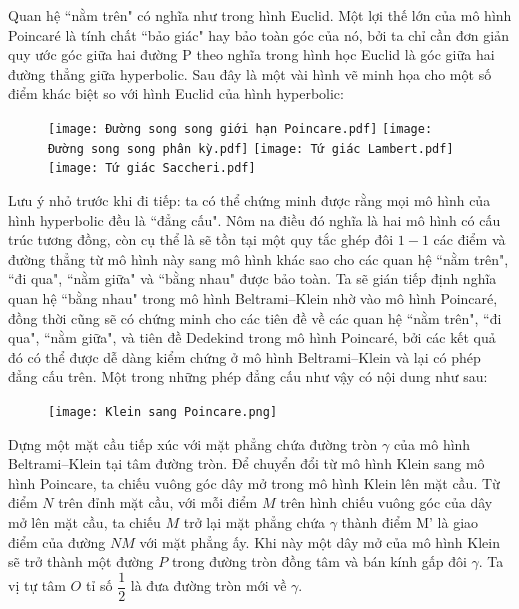 \begin{multicols}{2}
	Quan hệ ``nằm trên" có nghĩa như trong hình Euclid. Một lợi thế lớn của mô hình Poincaré là tính chất ``bảo giác" hay bảo toàn góc của nó, bởi ta chỉ cần đơn giản quy ước góc giữa hai đường P theo nghĩa trong hình học Euclid là góc giữa hai đường thẳng giữa hyperbolic.
	Sau đây là một vài hình vẽ minh họa cho một số điểm khác biệt so với hình Euclid của hình hyperbolic:
	\begin{figure}[H]
		\vspace*{-5pt}
		\centering
		\captionsetup{labelformat= empty, justification=centering}
		\texttt{[image: Đường song song giới hạn Poincare.pdf]}
		\texttt{[image: Đường song song phân kỳ.pdf]}
		\texttt{[image: Tứ giác Lambert.pdf]}
		\texttt{[image: Tứ giác Saccheri.pdf]}
		\vspace*{-10pt}
	\end{figure}	
	Lưu ý nhỏ trước khi đi tiếp: ta có thể chứng minh được rằng mọi mô hình của hình hyperbolic đều là ``đẳng cấu". Nôm na điều đó nghĩa là hai mô hình có cấu trúc tương đồng, còn cụ thể là sẽ tồn tại một quy tắc ghép đôi $1-1$ các điểm và đường thẳng từ mô hình này sang mô hình khác sao cho các quan hệ ``nằm trên", ``đi qua", ``nằm giữa" và ``bằng nhau" được bảo toàn. Ta sẽ gián tiếp định nghĩa quan hệ ``bằng nhau" trong mô hình Beltrami--Klein nhờ vào mô hình Poincaré, đồng thời cũng sẽ có chứng minh cho các tiên đề về các quan hệ ``nằm trên", ``đi qua", ``nằm giữa", và tiên đề Dedekind trong mô hình Poincaré, bởi các kết quả đó có thể được dễ dàng kiểm chứng ở mô hình Beltrami--Klein và lại có phép đẳng cấu trên. Một trong những phép đẳng cấu như vậy có nội dung như sau:
	\begin{figure}[H]
		\vspace*{-5pt}
		\centering
		\captionsetup{labelformat= empty, justification=centering}
		\texttt{[image: Klein sang Poincare.png]}
		\vspace*{-10pt}
	\end{figure}
	Dựng một mặt cầu tiếp xúc với mặt phẳng chứa đường tròn $\gamma$ của mô hình Beltrami--Klein tại tâm đường tròn. Để chuyển đổi từ mô hình Klein sang mô hình Poincare, ta chiếu vuông góc dây mở trong mô hình Klein lên mặt cầu. Từ điểm $N$ trên đỉnh mặt cầu, với mỗi điểm $M$ trên hình chiếu vuông góc của dây mở lên mặt cầu, ta chiếu $M$ trở lại mặt phẳng chứa $\gamma$ thành điểm M' là giao điểm của đường $NM$ với mặt phẳng ấy. Khi này một dây mở của mô hình Klein sẽ trở thành một đường $P$ trong đường tròn đồng tâm và bán kính gấp đôi $\gamma$. Ta vị tự tâm $O$ tỉ số $\dfrac{1}{2}$ là đưa đường tròn mới về $\gamma$.

\end{multicols}
